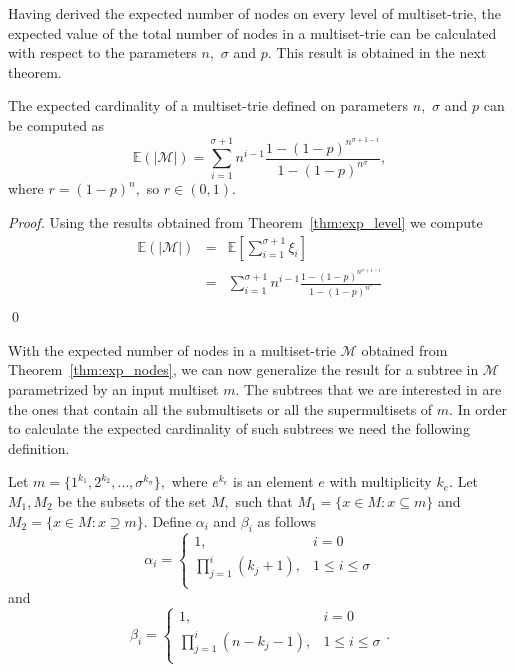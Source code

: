 Having derived the expected number of nodes on every level of multiset-trie, the
expected value of the total number of nodes in a multiset-trie can be calculated 
with respect to the parameters $n,$ $\sigma$ and $p.$ This result is obtained in 
the next theorem.

\begin{theorem}\label{thm:exp_nodes}
The expected cardinality of a multiset-trie defined on parameters $n,$ $\sigma$ 
and $p$ can be computed as 
\begin{equation}
\mathbb{E}( | \mathcal{M} | ) = \sum_{i=1}^{\sigma+1} n^{i-1} \frac{1-(1-p)^{n^{\sigma +1 -i}}}{1-(1-p)^{n^{\sigma}}},
\end{equation}
where $r = (1-p)^n,$ so $r\in(0,1).$
\end{theorem}
\begin{proof}
Using the results obtained from Theorem~\ref{thm:exp_level} we compute 
\begin{eqnarray*}
\mathbb{E}( | \mathcal{M} | ) &=& \mathbb{E}\left[ \sum_{i=1}^{\sigma+1} \xi_i \right] \\
&=& \sum_{i=1}^{\sigma + 1} n^{i-1} \frac{1-(1-p)^{n^{\sigma + 1 -i}}}{1-(1-p)^{n^{\sigma}}} \\
\end{eqnarray*}
\hspace*{\fill}\qed
\end{proof}

With the expected number of nodes in a multiset-trie $\mathcal{M}$ obtained from 
Theorem~\ref{thm:exp_nodes}, we can now generalize the result for a subtree 
in $\mathcal{M}$ parametrized by an input multiset $m.$ The subtrees that we 
are interested in are the ones that contain all the submultisets or all the 
supermultisets of $m.$ In order to calculate the expected cardinality of such 
subtrees we need the following definition. 

\begin{definition}\label{def:params}
Let $m = \{ 1^{k_1}, 2^{k_2}, \ldots, \sigma^{k_\sigma} \},$ where 
$e^{k_e}$ is an element $e$ with multiplicity $k_e.$ Let $M_1, M_2$ be 
the subsets of the set $M,$ such that $M_1 = \{ x\in M : x\subseteq m \}$ and 
$M_2 = \{ x\in M : x\supseteq m \}.$
Define $\alpha_i$ and $\beta_i$ as follows 
\begin{equation*}
\alpha_i = \begin{cases}
1, & i=0 \\
\prod_{j=1}^i (k_j+1), & 1\leq i\leq\sigma \\
\end{cases}
\end{equation*} 
and 
\begin{equation*}
\beta_i = \begin{cases}
1, & i=0 \\
\prod_{j=1}^i (n-k_j-1), & 1\leq i\leq\sigma \\
\end{cases}.
\end{equation*}
\end{definition}

